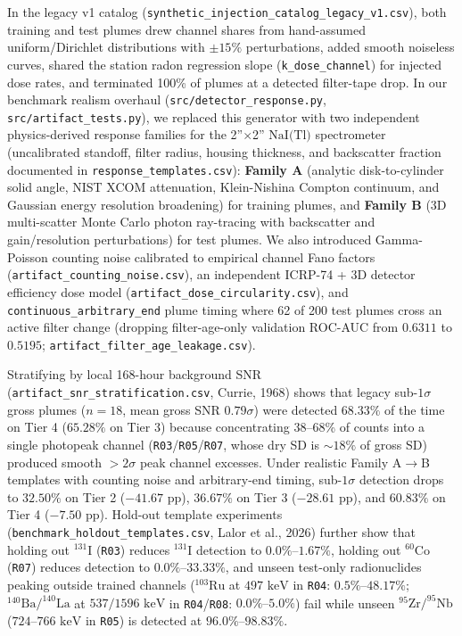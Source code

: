 \documentclass[11pt,a4paper]{article}
\begin{document}
\begin{framed}
In the legacy v1 catalog (\texttt{synthetic\_injection\_catalog\_legacy\_v1.csv}), both training and test plumes drew channel shares from hand-assumed uniform/Dirichlet distributions with $\pm 15\%$ perturbations, added smooth noiseless curves, shared the station radon regression slope (\texttt{k\_dose\_channel}) for injected dose rates, and terminated 100\% of plumes at a detected filter-tape drop. In our benchmark realism overhaul (\texttt{src/detector\_response.py}, \texttt{src/artifact\_tests.py}), we replaced this generator with two independent physics-derived response families for the 2''$\times$2'' $\text{NaI(Tl)}$ spectrometer (uncalibrated standoff, filter radius, housing thickness, and backscatter fraction documented in \texttt{response\_templates.csv}): \textbf{Family A} (analytic disk-to-cylinder solid angle, NIST XCOM attenuation, Klein-Nishina Compton continuum, and Gaussian energy resolution broadening) for training plumes, and \textbf{Family B} (3D multi-scatter Monte Carlo photon ray-tracing with backscatter and gain/resolution perturbations) for test plumes. We also introduced Gamma-Poisson counting noise calibrated to empirical channel Fano factors (\texttt{artifact\_counting\_noise.csv}), an independent ICRP-74 + 3D detector efficiency dose model (\texttt{artifact\_dose\_circularity.csv}), and \texttt{continuous\_arbitrary\_end} plume timing where 62 of 200 test plumes cross an active filter change (dropping filter-age-only validation ROC-AUC from $0.6311$ to $0.5195$; \texttt{artifact\_filter\_age\_leakage.csv}).

Stratifying by local 168-hour background SNR (\texttt{artifact\_snr\_stratification.csv}, Currie, 1968) shows that legacy sub-$1\sigma$ gross plumes ($n=18$, mean gross SNR $0.79\sigma$) were detected $68.33\%$ of the time on Tier 4 ($65.28\%$ on Tier 3) because concentrating 38--68\% of counts into a single photopeak channel (\texttt{R03}/\texttt{R05}/\texttt{R07}, whose dry SD is $\sim 18\%$ of gross SD) produced smooth $>2\sigma$ peak channel excesses. Under realistic Family A$\to$B templates with counting noise and arbitrary-end timing, sub-$1\sigma$ detection drops to $32.50\%$ on Tier 2 ($-41.67\text{ pp}$), $36.67\%$ on Tier 3 ($-28.61\text{ pp}$), and $60.83\%$ on Tier 4 ($-7.50\text{ pp}$). Hold-out template experiments (\texttt{benchmark\_holdout\_templates.csv}, Lalor et al., 2026) further show that holding out $^{131}\text{I}$ (\texttt{R03}) reduces $^{131}\text{I}$ detection to $0.0\%\text{--}1.67\%$, holding out $^{60}\text{Co}$ (\texttt{R07}) reduces detection to $0.0\%\text{--}33.33\%$, and unseen test-only radionuclides peaking outside trained channels ($^{103}\text{Ru}$ at $497\text{ keV}$ in \texttt{R04}: $0.5\%\text{--}48.17\%$; $^{140}\text{Ba}/^{140}\text{La}$ at $537/1596\text{ keV}$ in \texttt{R04}/\texttt{R08}: $0.0\%\text{--}5.0\%$) fail while unseen $^{95}\text{Zr}/^{95}\text{Nb}$ ($724\text{--}766\text{ keV}$ in \texttt{R05}) is detected at $96.0\%\text{--}98.83\%$.


\end{framed}
\end{document}
